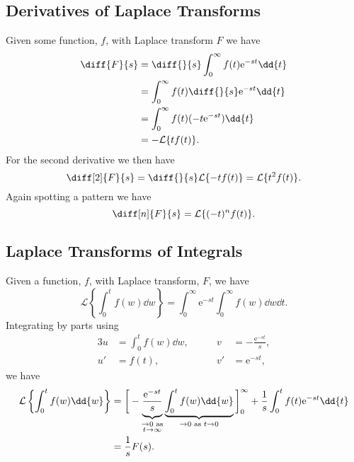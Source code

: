 \documentclass[fleqn]{NotesClass}
\newcommand*{\e}{\mathrm{e}}
\newcommand*{\laplaceTransform}{\mathcal{L}}
\begin{document}
    \subsection{Derivatives of Laplace Transforms}
    Given some function, \(f\), with Laplace transform \(F\) we have
    \begin{align}
        \diff{F}{s} &= \diff{}{s} \int_{0}^{\infty} f(t) \e^{-st} \dd{t}\\
        &= \int_{0}^{\infty} f(t) \diff{}{s} \e^{-st} \dd{t}\\
        &= \int_{0}^{\infty} f(t)(-t\e^{-st})\dd{t}\\
        &= -\laplaceTransform\{ tf(t) \}.
    \end{align}
    For the second derivative we then have
    \begin{equation}
        \diff[2]{F}{s} = \diff{}{s}\laplaceTransform\{ -tf(t) \} = \laplaceTransform\{ t^2f(t) \}.
    \end{equation}
    Again spotting a pattern we have
    \begin{equation}
        \diff[n]{F}{s} = \laplaceTransform\{ (-t)^nf(t) \}.
    \end{equation}
    
    \subsection{Laplace Transforms of Integrals}
    Given a function, \(f\), with Laplace transform, \(F\), we have
    \begin{equation}
        \laplaceTransform\left\{ \int_{0}^{t} f(w) \dd{w} \right\} = \int_{0}^{\infty} \e^{-st} \int_{0}^{\infty} f(w) \dd{w} \dd{t}.
    \end{equation}
    Integrating by parts using
    \begin{alignat}{3}
        u &= \int_{0}^{t}f(w)\dd{w}, \qquad & v &= -\frac{\e^{-st}}{s},\\
        u' &= f(t), \qquad & v' &= \e^{-st},
    \end{alignat}
    we have
    \begin{align}
        \laplaceTransform\left\{ \int_{0}^{t} f(w) \dd{w} \right\} &= \bigg[ -\underbrace{\vphantom{\int_{0}^{t}}\frac{\e^{-st}}{s}}_{\substack{\to 0\text{ as}\\ t \to \infty}} \underbrace{\int_{0}^{t} f(w) \dd{w}}_{\to 0 \text{ as } t \to 0} \bigg]_{0}^{\infty} + \frac{1}{s} \int_{0}^{t} f(t) \e^{-st} \dd{t}\\
        &= \frac{1}{s}F(s).
    \end{align}
    
\end{document}
